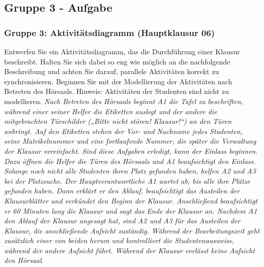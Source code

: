 \documentclass[18pt]{beamer}
\begin{document}
	\subsection{Gruppe 3 - Aufgabe}
	\begin{frame}
		\frametitle{Gruppe 3: Aktivitätsdiagramm (Hauptklausur 06)}
		\begin{tiny}
			Entwerfen Sie ein Aktivitätsdiagramm, das die Durchführung einer Klausur beschreibt. Halten
			Sie sich dabei so eng wie möglich an die nachfolgende Beschreibung und achten Sie darauf,
			parallele Aktivitäten korrekt zu synchronisieren. Beginnen Sie mit der Modellierung der
			Aktivitäten nach Betreten des Hörsaals.
			Hinweis: Aktivitäten der Studenten sind nicht zu modellieren.   \linebreak
			\textit{Nach Betreten des Hörsaals beginnt A1 die Tafel zu beschriften, während einer seiner
				Helfer die Etiketten auslegt und der andere die mitgebrachten Türschilder
				(„Bitte nicht stören! Klausur!“) an den Türen anbringt. Auf den Etiketten stehen
				der Vor- und Nachname jedes Studenten, seine Matrikelnummer und eine fortlaufende
				Nummer, die später die Verwaltung der Klausur vereinfacht.
				Sind diese Aufgaben erledigt, kann der Einlass beginnen. Dazu öffnen die Helfer
				die Türen des Hörsaals und A1 beaufsichtigt den Einlass. Solange noch nicht alle
				Studenten ihren Platz gefunden haben, helfen A2 und A3 bei der Platzsuche.
				Der Hauptverantwortliche A1 wartet ab, bis alle ihre Plätze gefunden haben. Dann
				erklärt er den Ablauf, beaufsichtigt das Austeilen der Klausurblätter und verkündet
				den Beginn der Klausur. Anschließend beaufsichtigt er 60 Minuten lang die Klausur
				und sagt das Ende der Klausur an.
				Nachdem A1 den Ablauf der Klausur angesagt hat, sind A2 und A3 für das Austeilen
				der Klausur, die anschließende Aufsicht zuständig. Während der Bearbeitungszeit
				geht zusätzlich einer von beiden herum und kontrolliert die Studentenausweise,
				während der andere Aufsicht führt.
				Während der Klausur verlässt keine Aufsicht den Hörsaal. } \linebreak
		\end{tiny}
	\end{frame}
\end{document}
